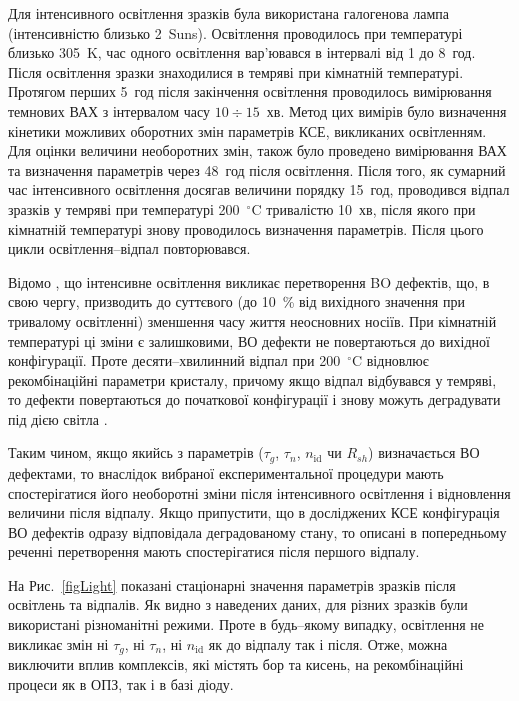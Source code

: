 Для інтенсивного освітлення зразків була використана галогенова лампа (інтенсивністю близько 2~Suns).
Освітлення проводилось при температурі близько 305~K,
час одного освітлення вар'ювався в інтервалі від 1 до 8~год.
Після освітлення зразки знаходилися в темряві при кімнатній температурі.
Протягом перших 5~год після закінчення освітлення проводилось вимірювання темнових ВАХ з інтервалом часу $10\div15$~хв.
Метод цих вимірів було визначення кінетики можливих оборотних змін параметрів КСЕ, викликаних освітленням.
Для оцінки величини необоротних змін, також було проведено вимірювання ВАХ та визначення параметрів через 48~год
після освітлення.
Після того, як сумарний час інтенсивного освітлення досягав величини порядку 15~год,
проводився відпал зразків у темряві при температурі 200~$^\circ$C тривалістю 10~хв,
після якого при кімнатній температурі знову проводилось визначення параметрів.
Після цього цикли освітлення--відпал повторювався.

Відомо \cite{LIDRev,LIDRev2}, що інтенсивне освітлення викликає перетворення BO дефектів, що, в свою
чергу, призводить до суттєвого (до 10~\% від вихідного значення при тривалому освітленні) зменшення часу життя неосновних носіїв.
При кімнатній температурі ці зміни є залишковими, ВО дефекти не повертаються до вихідної конфігурації.
Проте десяти--хвилинний відпал при 200~$^\circ$C відновлює рекомбінаційні параметри кристалу, причому
якщо відпал відбувався у темряві, то дефекти повертаються до початкової конфігурації і знову можуть деградувати під
дією світла \cite{BO:Halam2016,LIDRev2,Kim}.

Таким чином, якщо якийсь з параметрів ($\tau_g$, $\tau_n$, $n_{\mathrm{id}}$ чи $R_{sh}$) визначається ВО дефектами,
то внаслідок вибраної експериментальної процедури мають спостерігатися його необоротні зміни після інтенсивного освітлення і відновлення
величини після відпалу.
Якщо припустити, що в досліджених КСЕ конфігурація ВО дефектів одразу відповідала деградованому стану,
то описані в попередньому реченні перетворення мають спостерігатися після першого відпалу.

На Рис.~\ref{figLight} показані стаціонарні значення параметрів зразків після освітлень та відпалів.
Як видно з наведених даних, для різних зразків були використані різноманітні режими.
Проте в будь--якому випадку, освітлення не викликає змін ні $\tau_g$, ні $\tau_n$, ні $n_{\mathrm{id}}$ як до
відпалу так і після.
Отже, можна виключити вплив комплексів, які містять бор та кисень, на рекомбінаційні процеси
як в ОПЗ, так і в базі діоду.

